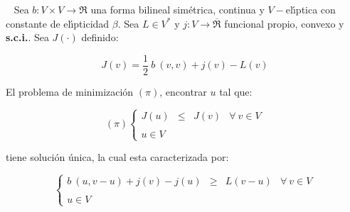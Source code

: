 \begin{lema}
\ \newline
Sea $b : V\times V \longrightarrow \Re$ una forma bilineal sim\'etrica,
continua y $V-$el\'{\i}ptica con constante de el\'{\i}pticidad $\beta$. Sea
$L \in V^*$ y $j:V \longrightarrow \overline{\Re}$ funcional propio, convexo y
\textbf{s.c.i.}. Sea $J (\cdot )$ definido:

\begin{displaymath}
J(v) = \frac{1}{2}\ b\ (v,v)+j(v)-L(v)
\end{displaymath}

El problema de minimizaci\'on $(\pi)$, encontrar $u$ tal que:

\begin{equation}
(\pi) \left\{ \begin{array}{lrlr}
J(u) &\le & J(v) & \forall \ v \in V\\
\\
u \in V
\end{array} \right.
\end{equation}

tiene soluci\'on \'unica, la cual esta caracterizada por:

\begin{equation} \label{eq:caracter}
\left\{ \begin{array}{lrlr}
b\ (u,v-u)+j(v)-j(u)&\ge & L (v-u) & \forall \ v \in V\\
\\
u \in V
\end{array} \right.
\end{equation}

\end{lema}

